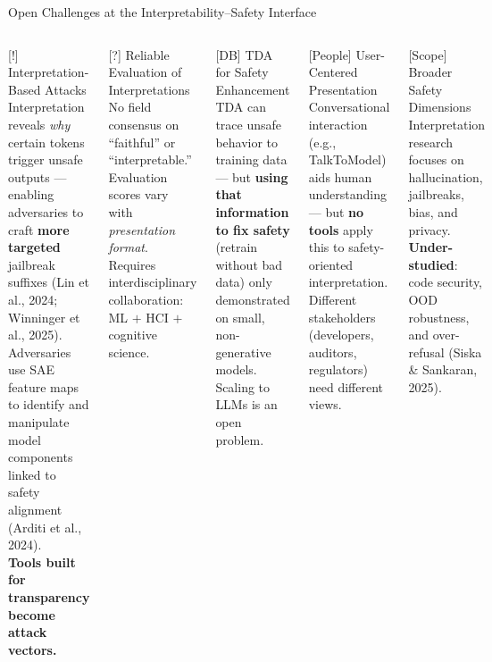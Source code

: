 

\begin{frame}{Open Challenges at the Interpretability–Safety Interface}
  \begin{columns}[T]
    \begin{ucrcard}[UCRnavy]{[!] Interpretation-Based Attacks}
      \scriptsize
      Interpretation reveals \emph{why} certain tokens trigger unsafe outputs --- enabling adversaries to craft \textbf{more targeted} jailbreak suffixes (Lin et al., 2024; Winninger et al., 2025).\\[3pt]
      Adversaries use SAE feature maps to identify and manipulate model components linked to safety alignment (Arditi et al., 2024).\\[3pt]
      \textbf{Tools built for transparency become attack vectors.}
    \end{ucrcard}\vspace{3pt}
    \begin{ucrcard}[UCRnavy]{[?] Reliable Evaluation of Interpretations}
      \scriptsize
      No field consensus on ``faithful'' or ``interpretable.'' Evaluation scores vary with \emph{presentation format}. Requires interdisciplinary collaboration: ML $+$ HCI $+$ cognitive science.
    \end{ucrcard}

    \begin{ucrcard}[UCRnavy]{[DB] TDA for Safety Enhancement}
      \scriptsize
      TDA can trace unsafe behavior to training data --- but \textbf{using that information to fix safety} (retrain without bad data) only demonstrated on small, non-generative models. Scaling to LLMs is an open problem.
    \end{ucrcard}\vspace{3pt}
    \begin{ucrcard}[UCRnavy]{[People] User-Centered Presentation}
      \scriptsize
      Conversational interaction (e.g., TalkToModel) aids human understanding --- but \textbf{no tools} apply this to safety-oriented interpretation. Different stakeholders (developers, auditors, regulators) need different views.
    \end{ucrcard}\vspace{3pt}
    \begin{ucrcard}[UCRnavy]{[Scope] Broader Safety Dimensions}
      \scriptsize
      Interpretation research focuses on hallucination, jailbreaks, bias, and privacy. \textbf{Under-studied}: code security, OOD robustness, and over-refusal (Siska \& Sankaran, 2025).
    \end{ucrcard}
  \end{columns}
\end{frame}


